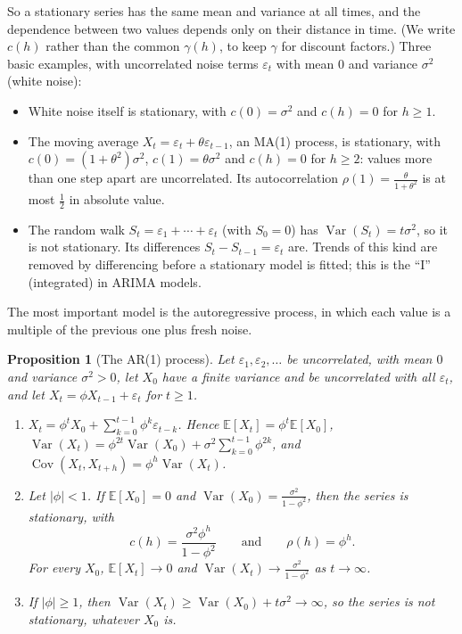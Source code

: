 \documentclass[11pt]{article}
\newcommand{\E}{\mathbb{E}}
\DeclareMathOperator{\Var}{Var}
\DeclareMathOperator{\Cov}{Cov}
\theoremstyle{definition}
\theoremstyle{plain}
\newtheorem{proposition}[definition]{Proposition}
\theoremstyle{remark}
\begin{document}
So a stationary series has the same mean and variance at all times, and the dependence between two values depends only on their distance in time. (We write $c(h)$ rather than the common $\gamma(h)$, to keep $\gamma$ for discount factors.) Three basic examples, with uncorrelated noise terms $\varepsilon_t$ with mean $0$ and variance $\sigma^2$ (white noise):
\begin{itemize}
    \item White noise itself is stationary, with $c(0) = \sigma^2$ and $c(h) = 0$ for $h \geq 1$.
    \item The moving average $X_t = \varepsilon_t + \theta\varepsilon_{t-1}$, an MA(1) process, is stationary, with $c(0) = (1 + \theta^2)\sigma^2$, $c(1) = \theta\sigma^2$ and $c(h) = 0$ for $h \geq 2$: values more than one step apart are uncorrelated. Its autocorrelation $\rho(1) = \frac{\theta}{1 + \theta^2}$ is at most $\frac{1}{2}$ in absolute value.
    \item The random walk $S_t = \varepsilon_1 + \cdots + \varepsilon_t$ (with $S_0 = 0$) has $\Var(S_t) = t\sigma^2$, so it is not stationary. Its differences $S_t - S_{t-1} = \varepsilon_t$ are. Trends of this kind are removed by differencing before a stationary model is fitted; this is the ``I'' (integrated) in ARIMA models.
\end{itemize}

The most important model is the autoregressive process, in which each value is a multiple of the previous one plus fresh noise.

\begin{proposition}[The AR(1) process]\label{prop:ar1}
    Let $\varepsilon_1, \varepsilon_2, \ldots$ be uncorrelated, with mean $0$ and variance $\sigma^2 > 0$, let $X_0$ have a finite variance and be uncorrelated with all $\varepsilon_t$, and let $X_t = \phi X_{t-1} + \varepsilon_t$ for $t \geq 1$.
    \begin{enumerate}
        \item $X_t = \phi^tX_0 + \sum_{k=0}^{t-1}\phi^k\varepsilon_{t-k}$. Hence $\E[X_t] = \phi^t\E[X_0]$, $\Var(X_t) = \phi^{2t}\Var(X_0) + \sigma^2\sum_{k=0}^{t-1}\phi^{2k}$, and $\Cov(X_t, X_{t+h}) = \phi^h\Var(X_t)$.
        \item Let $|\phi| < 1$. If $\E[X_0] = 0$ and $\Var(X_0) = \frac{\sigma^2}{1 - \phi^2}$, then the series is stationary, with
        \[c(h) = \frac{\sigma^2\phi^h}{1 - \phi^2} \qquad \text{and} \qquad \rho(h) = \phi^h.\]
        For every $X_0$, $\E[X_t] \to 0$ and $\Var(X_t) \to \frac{\sigma^2}{1 - \phi^2}$ as $t \to \infty$.
        \item If $|\phi| \geq 1$, then $\Var(X_t) \geq \Var(X_0) + t\sigma^2 \to \infty$, so the series is not stationary, whatever $X_0$ is.
    \end{enumerate}
\end{proposition}
\end{document}

